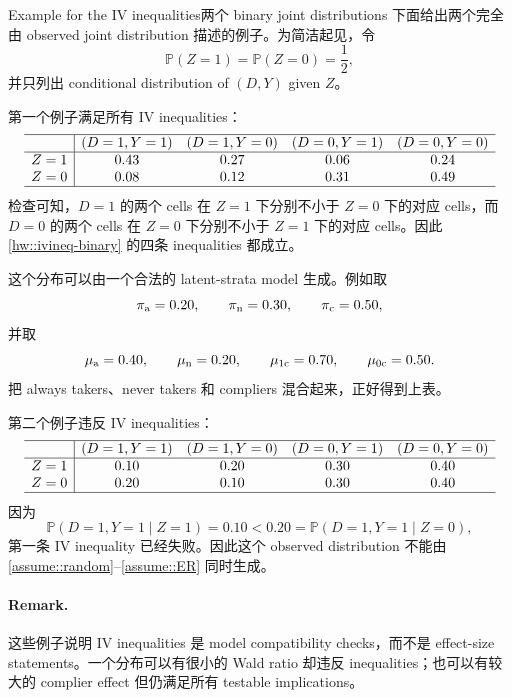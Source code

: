 \begin{exercisesolution}{Example for the IV inequalities}{两个 binary joint distributions}
下面给出两个完全由 observed joint distribution 描述的例子。为简洁起见，令
\[
\mathbb{P}(Z=1)=\mathbb{P}(Z=0)=\frac{1}{2},
\]
并只列出 conditional distribution of $(D,Y)$ given $Z$。

第一个例子满足所有 IV inequalities：
\[
\begin{array}{c|cccc}
\hline
& (D=1,Y=1) & (D=1,Y=0) & (D=0,Y=1) & (D=0,Y=0)\\
\hline
Z=1 & 0.43 & 0.27 & 0.06 & 0.24\\
Z=0 & 0.08 & 0.12 & 0.31 & 0.49\\
\hline
\end{array}
\]
检查可知，$D=1$ 的两个 cells 在 $Z=1$ 下分别不小于 $Z=0$ 下的对应 cells，而 $D=0$ 的两个 cells 在 $Z=0$ 下分别不小于 $Z=1$ 下的对应 cells。因此 \cref{hw::ivineq-binary} 的四条 inequalities 都成立。

这个分布可以由一个合法的 latent-strata model 生成。例如取
\[
\pi_{\textup{a}}=0.20,\qquad \pi_{\textup{n}}=0.30,\qquad \pi_{\textup{c}}=0.50,
\]
并取
\[
\mu_{\textup{a}}=0.40,\qquad \mu_{\textup{n}}=0.20,\qquad
\mu_{1\textup{c}}=0.70,\qquad \mu_{0\textup{c}}=0.50.
\]
把 always takers、never takers 和 compliers 混合起来，正好得到上表。

第二个例子违反 IV inequalities：
\[
\begin{array}{c|cccc}
\hline
& (D=1,Y=1) & (D=1,Y=0) & (D=0,Y=1) & (D=0,Y=0)\\
\hline
Z=1 & 0.10 & 0.20 & 0.30 & 0.40\\
Z=0 & 0.20 & 0.10 & 0.30 & 0.40\\
\hline
\end{array}
\]
因为
\[
\mathbb{P}(D=1,Y=1\mid Z=1)=0.10
<
0.20
=\mathbb{P}(D=1,Y=1\mid Z=0),
\]
第一条 IV inequality 已经失败。因此这个 observed distribution 不能由 \cref{assume::random}--\cref{assume::ER} 同时生成。

\paragraph{Remark.}
这些例子说明 IV inequalities 是 model compatibility checks，而不是 effect-size statements。一个分布可以有很小的 Wald ratio 却违反 inequalities；也可以有较大的 complier effect 但仍满足所有 testable implications。
\end{exercisesolution}

